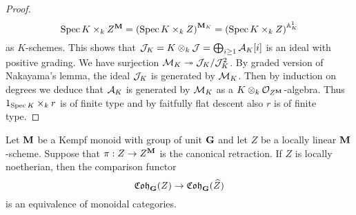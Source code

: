 \begin{proof}
$$\mathrm{Spec}\, K\times_k Z^{\mathbf{M}} = \left(\mathrm{Spec}\, K \times_k Z\right)^{\mathbf{M}_K} = \left(\mathrm{Spec}\, K \times_k Z\right)^{\mathbb{A}^1_K}$$
as $K$-schemes. This shows that ${\mathcal J}_K = K\otimes_k{\mathcal J} = \bigoplus_{i\geq 1} {\mathcal A}_K[i]$ is an ideal with positive grading. We have surjection ${\mathcal M}_K\twoheadrightarrow {\mathcal J}_K/{\mathcal J}_K^2$. By graded version of Nakayama's lemma, the ideal ${\mathcal J}_K$  is generated by ${\mathcal M}_K$. Then by induction on degrees we deduce that ${\mathcal A}_K$ is generated by ${\mathcal M}_K$ as a $K\otimes_k{\mathcal O}_{Z^{\mathbf{M}}}$-algebra. Thus $1_{\mathrm{Spec}\, K}\times_k r$ is of finite type and by faitfully flat descent also $r$ is of finite type.
\end{proof}

\begin{theorem}\label{theorem:comparison_functor_is_an_equivalence}
Let $\mathbf{M}$ be a Kempf monoid with group of unit $\mathbf{G}$ and let $Z$ be a locally linear $\mathbf{M}$-scheme. Suppose that $\pi:Z\rightarrow Z^{\mathbf{M}}$ is the canonical retraction. If $Z$ is locally noetherian, then the comparison functor
$$\mathfrak{Coh}_{\mathbf{G}}(Z)\rightarrow \mathfrak{Coh}_{\mathbf{G}}(\widehat{Z})$$
is an equivalence of monoidal categories.
\end{theorem}
